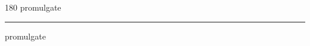 
\begin{frame}
\begin{center}
\begin{turn}{180}
{\fontsize{2.5cm}{1em}\selectfont promulgate}
\end{turn}
\vspace{1em}\par  
\hrule
\vspace{1em}\par  
{\fontsize{2.5cm}{1em}\selectfont promulgate}
\end{center}
\end{frame}
